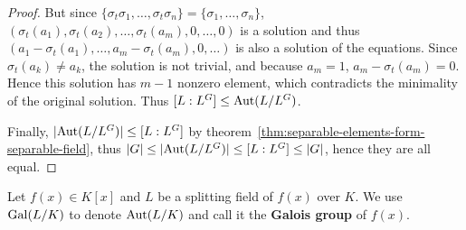 \begin{theorem}
\begin{proof}
    But since $\{\sigma_t \sigma_1, \dots, \sigma_t \sigma_n\} = \{\sigma_1, \dots, \sigma_n\}$,
    $(\sigma_t(a_1), \sigma_t(a_2), \dots, \sigma_t(a_m), 0, \dots, 0)$ is a solution
    and thus $(a_1 - \sigma_t(a_1), \dots, a_m - \sigma_t(a_m), 0, \dots)$ is also a solution of the equations.
    Since $\sigma_t(a_k) \neq a_k$, the solution is not trivial, and because $a_m = 1$, $a_m - \sigma_t(a_m) = 0$.
    Hence this solution has $m-1$ nonzero element, which contradicts the minimality of the original solution.
    Thus $[L: L^G] \leq \operatorname{Aut}(L/L^G)$.

    Finally, $\lvert\operatorname{Aut}(L/L^G)\rvert \leq [L: L^G]$ by theorem~\ref{thm:separable-elements-form-separable-field},
    thus $\lvert G\rvert \leq \lvert\operatorname{Aut}(L/L^G)\rvert \leq [L: L^G] \leq \lvert G\rvert$, hence they are all equal.
  \end{proof}
\end{theorem}

\begin{definition}
  Let $f(x) \in K[x]$ and $L$ be a splitting field of $f(x)$ over $K$. We use
  $\operatorname{Gal}(L/K)$ to denote $\operatorname{Aut}(L/K)$ and call it the
  {\bf Galois group} of $f(x)$.
\end{definition}

